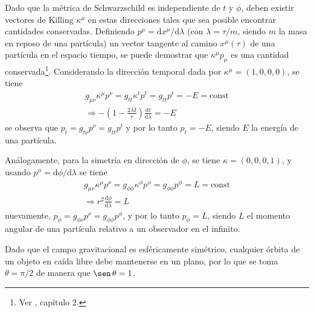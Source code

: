 \documentclass[11pt,twoside,openright,spanish]{report}
\numberwithin{equation}{chapter}
\numberwithin{figure}{chapter}
\numberwithin{table}{chapter}
\renewcommand{\sin}{\operatorname{\sen}}
\begin{document}
Dado que la métrica de Schwarzschild es independiente de $t$ y $\phi$, deben existir vectores de Killing $\kappa^\mu$ en estas direcciones tales que sea posible encontrar cantidades conservadas. Definiendo $p^\mu=\text{d}x^\mu/\text{d}\lambda$ (con $\lambda=\tau/m$, siendo $m$ la masa en reposo de una partícula) un vector tangente al camino $x^\mu\left(\tau\right)$ de una partícula en el espacio tiempo, se puede demostrar que $\kappa^\mu p_\mu$ es una cantidad conservada\footnote{Ver \citet{Raine2014}, capítulo 2.}. Considerando la dirección temporal dada por $\kappa^\mu=\left(1,0,0,0\right)$, se tiene
\begin{align}
g_{\mu\nu}\kappa^\mu p^\nu=g_{tt}\kappa^tp^t=g_{tt}p^{t}=-E=\text{const}\\
\Rightarrow -\left(1-\frac{2M}{r}\right)\frac{\text{d}t}{\text{d}\lambda}=-E
\end{align}
se observa que $p_t=g_{t\nu}p^\nu=g_{tt}p^t$ y por lo tanto $p_t=-E$, siendo $E$ la energía de una partícula.

Análogamente, para la simetría en dirección de $\phi$, se tiene $\kappa=\left(0,0,0,1\right)$, y usando $p^\phi=\text{d}\phi/\text{d}\lambda$ se tiene
\begin{eqnarray}
g_{\mu\nu}\kappa^\mu p^\nu=g_{\phi\phi}\kappa^\phi p^\phi=g_{\phi\phi}p^\phi=L=\text{const}\\
\Rightarrow r^2\frac{\text{d}\phi}{\text{d}\lambda}=L
\end{eqnarray}
nuevamente, $p_\phi=g_{\phi\nu}p^\nu=g_{\phi\phi}p^\phi$, y por lo tanto $p_\phi=L$, siendo $L$ el momento angular de una partícula relativo a un observador en el infinito.

Dado que el campo gravitacional es esféricamente simétrico, cualquier órbita de un objeto en caída libre debe mantenerse en un plano, por lo que se toma $\theta=\pi/2$ de manera que $\sin\theta=1$.
\end{document}
